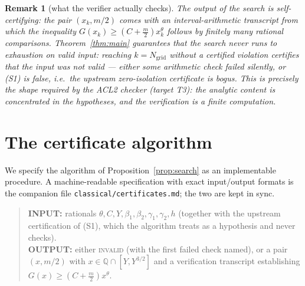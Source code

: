 \documentclass[11pt]{amsart}
\newtheorem{remark}[theorem]{Remark}
\numberwithin{equation}{section}
\newcommand{\Q}{\mathbb{Q}}
\begin{document}
\begin{remark}[what the verifier actually checks]
The output of the search is \emph{self-certifying}: the pair
$(x_k, m/2)$ comes with an interval-arithmetic transcript from which
the inequality $G(x_k) \ge (C + \tfrac{m}{2})x_k^{\theta}$ follows by
finitely many rational comparisons. Theorem~\ref{thm:main} guarantees
that the search never runs to exhaustion on valid input: reaching
$k = N_{\mathrm{grid}}$ without a certified violation certifies that
the input was \emph{not} valid --- either some arithmetic check
failed silently, or (S1) is false, i.e.\ the upstream zero-isolation
certificate is bogus. This is precisely the shape required by the
ACL2 checker (target T3): the analytic content is concentrated in the
hypotheses, and the verification is a finite computation.
\end{remark}

\section{The certificate algorithm}\label{sec:algorithm}

We specify the algorithm of Proposition~\ref{prop:search} as an
implementable procedure. A machine-readable specification with exact
input/output formats is the companion file
\texttt{classical/certificates.md}; the two are kept in sync.

\begin{quote}
\textbf{INPUT:} rationals
$\theta, C, Y, \beta_1, \beta_2, \gamma_1, \gamma_2, h$
(together with the upstream certification of (S1), which the
algorithm treats as a hypothesis and never checks).\\[4pt]
\textbf{OUTPUT:} either \textsc{invalid} (with the first failed
check named), or a pair $(x, m/2)$ with $x \in \Q \cap [Y, Y^{3/2}]$
and a verification transcript establishing
$G(x) \ge (C + \tfrac{m}{2})x^{\theta}$.
\end{quote}
\end{document}
